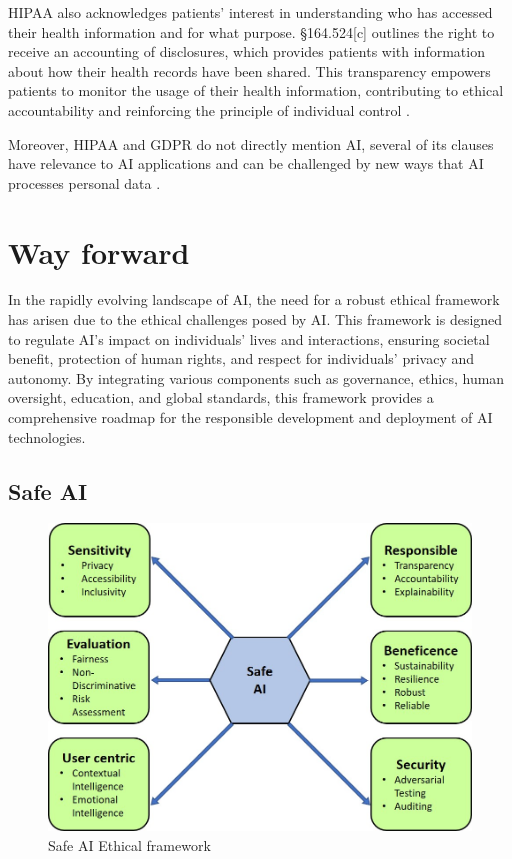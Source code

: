 \documentclass{article}
\begin{document}
HIPAA also acknowledges patients' interest in understanding who has accessed their health information and for what purpose. §164.524[c] outlines the right to receive an accounting of disclosures, which provides patients with information about how their health records have been shared. This transparency empowers patients to monitor the usage of their health information, contributing to ethical accountability and reinforcing the principle of individual control \cite{rule2022us}.

Moreover, HIPAA and GDPR do not directly mention AI, several of its clauses have relevance to AI applications and can be challenged by new ways that AI processes personal data \cite{cohen2018hipaa, chen2017hipaa}.


\section{Way forward}
In the rapidly evolving landscape of AI, the need for a robust ethical framework has arisen due to the ethical challenges posed by AI. This framework is designed to regulate AI's impact on individuals' lives and interactions, ensuring societal benefit, protection of human rights, and respect for individuals' privacy and autonomy. By integrating various components such as governance, ethics, human oversight, education, and global standards, this framework provides a comprehensive roadmap for the responsible development and deployment of AI technologies.

\subsection{Safe AI}

\begin{figure}
\centering
\includegraphics[width=0.85\linewidth]{safe.jpg}
\caption{\label{fig:1.6}Safe AI Ethical framework}
\end{figure}
\end{document}
